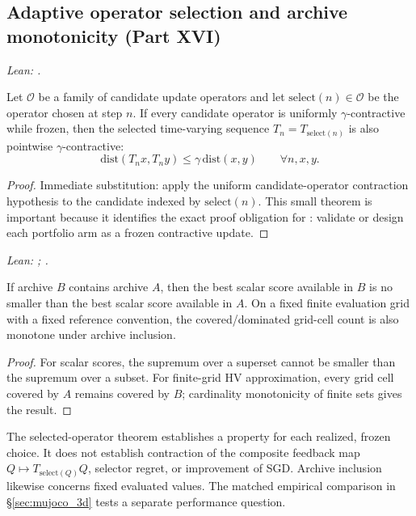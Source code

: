 \subsection{Adaptive operator selection and archive monotonicity (Part XVI)}
\label{sec:portfolio_theory}

\begin{theorem}
\label{thm:selected_operator}
\emph{Lean: .}

Let $\mathcal{O}$ be a family of candidate update operators and let $\mathrm{select}(n)\in\mathcal{O}$ be the operator chosen at step $n$.  If every candidate operator is uniformly $\gamma$-contractive while frozen, then the selected time-varying sequence $T_n=T_{\mathrm{select}(n)}$ is also pointwise $\gamma$-contractive:
\begin{equation}
    \mathrm{dist}(T_n x, T_n y) \le \gamma\,\mathrm{dist}(x,y)
    \qquad \forall n,x,y .
\end{equation}
\end{theorem}

\begin{proof}
Immediate substitution: apply the uniform candidate-operator contraction hypothesis to the candidate indexed by $\mathrm{select}(n)$.  This small theorem is important because it identifies the exact proof obligation for \bamorv{}: validate or design each portfolio arm as a frozen contractive update.
\end{proof}

\begin{theorem}
\label{thm:archive_mono}
\emph{Lean: ; .}

If archive $B$ contains archive $A$, then the best scalar score available in $B$ is no smaller than the best scalar score available in $A$.  On a fixed finite evaluation grid with a fixed reference convention, the covered/dominated grid-cell count is also monotone under archive inclusion.
\end{theorem}

\begin{proof}
For scalar scores, the supremum over a superset cannot be smaller than the supremum over a subset.  For finite-grid HV approximation, every grid cell covered by $A$ remains covered by $B$; cardinality monotonicity of finite sets gives the result.
\end{proof}

\begin{remark}
The selected-operator theorem establishes a property for each realized, frozen choice. It does not establish contraction of the composite feedback map $Q\mapsto T_{\mathrm{select}(Q)}Q$, selector regret, or improvement of SGD. Archive inclusion likewise concerns fixed evaluated values. The matched empirical comparison in \S\ref{sec:mujoco_3d} tests a separate performance question.
\end{remark}


